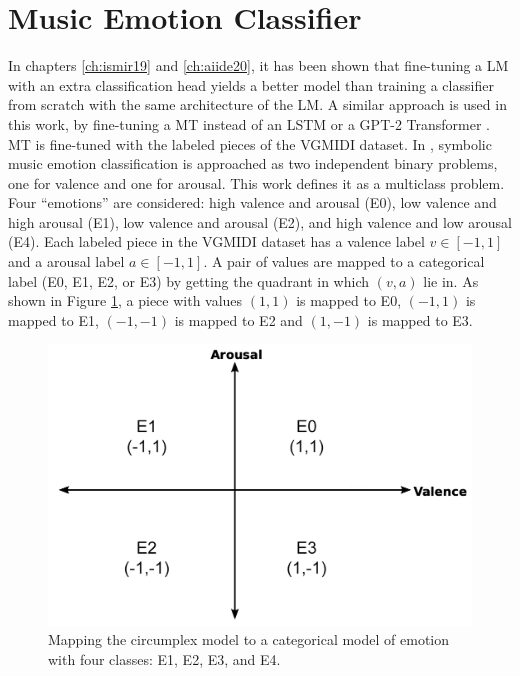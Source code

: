 
\section{Music Emotion Classifier}
\label{sec:emotion_classifier}

In chapters \ref{ch:ismir19} and \ref{ch:aiide20}, it has been shown that fine-tuning a LM with an extra classification head yields a better model than training a classifier from scratch with the same architecture of the LM. A similar approach is used in this work, by fine-tuning a MT instead of an LSTM \cite{ferreira_2019} or a GPT-2 Transformer \cite{ferreira2020computer}. MT is fine-tuned with the labeled pieces of the VGMIDI dataset. In \cite{ferreira_2019, ferreira2020computer}, symbolic music emotion classification is approached as two independent binary problems, one for valence and one for arousal. This work defines it as a multiclass problem. Four ``emotions'' are considered: high valence and arousal (E0), low valence and high arousal (E1), low valence and arousal (E2), and high valence and low arousal (E4). Each labeled piece in the VGMIDI dataset has a valence label $v \in [-1, 1]$ and a arousal label $a \in [-1, 1]$. A pair of values are mapped to a categorical label (E0, E1, E2, or E3) by getting the quadrant in which $(v,a)$ lie in. As shown in Figure \ref{fig:va_mapping}, a piece with values $(1,1)$ is mapped to E0, $(-1,1)$ is mapped to E1, $(-1,-1)$ is mapped to E2 and $(1, -1)$ is mapped to E3.

\begin{figure}
 \centering
 \includegraphics[width=0.7\columnwidth]{imgs/ismir21/circumplex.png}
 \caption{Mapping the circumplex model to a categorical model of emotion with four classes: E1, E2, E3, and E4.}
 \label{fig:va_mapping}
\end{figure}

